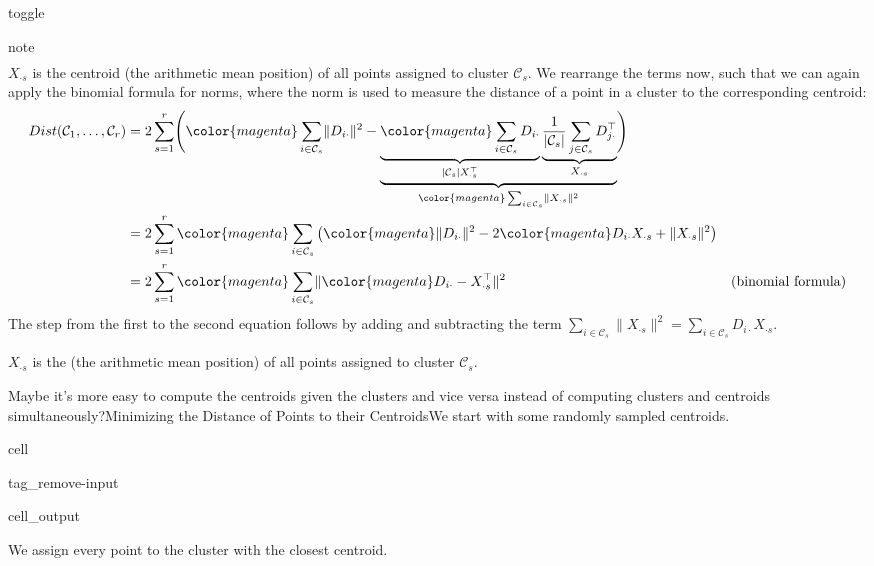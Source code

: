 \documentclass[letterpaper,10pt,english]{jupyterBook}
\begin{document}
\begin{sphinxuseclass}{toggle}
\begin{sphinxadmonition}{note}
\begin{align}
\end{align}
\sphinxAtStartPar
\(X_{\cdot s}\) is the centroid (the arithmetic mean position) of all points assigned to cluster \(\mathcal{C}_s\).
We rearrange the terms now, such that we can again apply the binomial formula for norms, where the norm is used to measure  the distance of a point in a cluster to the corresponding centroid:
\label{equation:clustering_k_means:591a5a60-1e6f-4580-b4a2-e67b62f33d83}\begin{align}
        Dist(\mathcal{C}_1,\ldots,\mathcal{C}_r)
    &=2\sum_{s=1}^r\Biggl({\color{magenta}\sum_{i\in\mathcal{C}_s}\lVert D_{i\cdot}\rVert^2}-\underbrace{\underbrace{{\color{magenta}\sum_{i\in\mathcal{C}_s} D_{i\cdot}}}_{\lvert\mathcal{C}_s\rvert X_{\cdot s}^\top} \underbrace{\frac{1}{|\mathcal{C}_s|}\sum_{j\in\mathcal{C}_s}D_{j\cdot}^\top}_{X_{\cdot s}}}_{{\color{magenta}\sum_{i\in\mathcal{C}_s}}\lVert X_{\cdot s}\rVert^2}\Biggr)\\
    &=2\sum_{s=1}^r{\color{magenta}\sum_{i\in\mathcal{C}_s}} \left({\color{magenta}\lVert D_{i\cdot}\rVert^2}- 2{\color{magenta}D_{i\cdot}}X_{\cdot s} +\lVert X_{\cdot s}\rVert^2\right)\\
    &=2\sum_{s=1}^r{\color{magenta}\sum_{i\in\mathcal{C}_s}} \lVert {\color{magenta}D_{i\cdot}}-X_{\cdot s}^\top\rVert^2
    &\text{(binomial formula)}
    \end{align}
\sphinxAtStartPar
The step from the first to the second equation follows by adding and subtracting the term \(\sum_{i\in\mathcal{C}_s}\lVert X_{\cdot s}\rVert^2= \sum_{i\in\mathcal{C}_s} D_{i\cdot}X_{\cdot s}\).
\end{sphinxadmonition}

\end{sphinxuseclass}
\sphinxAtStartPar
\(X_{\cdot s}\) is the  (the arithmetic mean position) of all points assigned to cluster \(\mathcal{C}_s\).

\sphinxAtStartPar
Maybe it’s more easy to compute the centroids given the clusters and vice versa instead of computing clusters and centroids simultaneously?Minimizing the Distance of Points to their CentroidsWe start with some randomly sampled centroids.

\begin{sphinxuseclass}{cell}
\begin{sphinxuseclass}{tag_remove-input}\begin{sphinxVerbatimOutput}

\begin{sphinxuseclass}{cell_output}
\noindent{}

\end{sphinxuseclass}\end{sphinxVerbatimOutput}

\end{sphinxuseclass}
\end{sphinxuseclass}
\sphinxAtStartPar
We assign every point to the cluster with the closest centroid.
\end{document}
